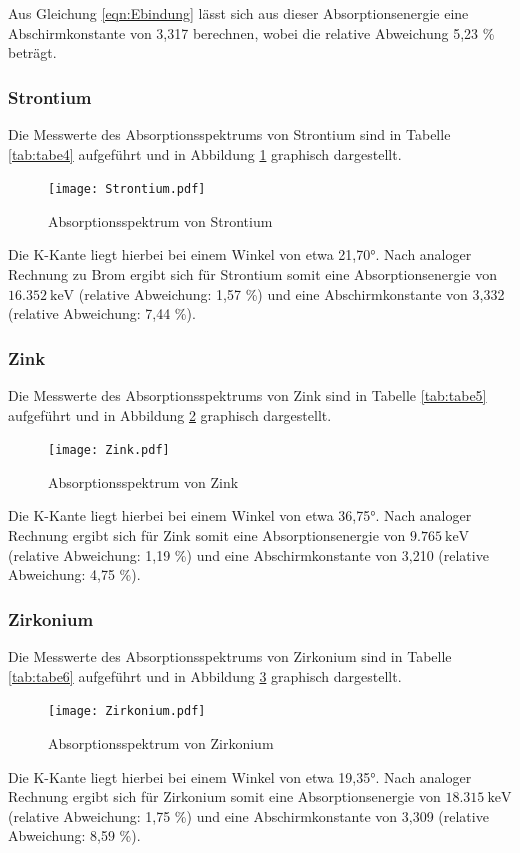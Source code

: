 Aus Gleichung \ref{eqn:Ebindung} lässt sich aus dieser Absorptionsenergie eine Abschirmkonstante
von 3,317 berechnen, wobei die relative Abweichung 5,23 \% beträgt.

\subsubsection{Strontium}
Die Messwerte des Absorptionsspektrums von Strontium sind in Tabelle \ref{tab:tabe4} aufgeführt und
in Abbildung \ref{fig:Strontium} graphisch dargestellt.

\begin{figure}[H]
  \centering
  \texttt{[image: Strontium.pdf]}
  \caption{Absorptionsspektrum von Strontium}
  \label{fig:Strontium}
\end{figure}
Die K-Kante liegt hierbei bei einem Winkel von etwa 21,70°. Nach analoger Rechnung zu Brom
ergibt sich für Strontium somit eine Absorptionsenergie von $\SI{16.352}{\kilo\electronvolt}$
(relative Abweichung: 1,57 \%) und eine Abschirmkonstante von 3,332 (relative Abweichung: 7,44 \%).

\subsubsection{Zink}
Die Messwerte des Absorptionsspektrums von Zink sind in Tabelle \ref{tab:tabe5} aufgeführt und
in Abbildung \ref{fig:Zink} graphisch dargestellt.

\begin{figure}[H]
  \centering
  \texttt{[image: Zink.pdf]}
  \caption{Absorptionsspektrum von Zink}
  \label{fig:Zink}
\end{figure}
Die K-Kante liegt hierbei bei einem Winkel von etwa 36,75°. Nach analoger Rechnung
ergibt sich für Zink somit eine Absorptionsenergie von $\SI{9.765}{\kilo\electronvolt}$
(relative Abweichung: 1,19 \%) und eine Abschirmkonstante von 3,210 (relative Abweichung: 4,75 \%).

\subsubsection{Zirkonium}
Die Messwerte des Absorptionsspektrums von Zirkonium sind in Tabelle \ref{tab:tabe6} aufgeführt und
in Abbildung \ref{fig:Zirkonium} graphisch dargestellt.

\begin{figure}[H]
  \centering
  \texttt{[image: Zirkonium.pdf]}
  \caption{Absorptionsspektrum von Zirkonium}
  \label{fig:Zirkonium}
\end{figure}
Die K-Kante liegt hierbei bei einem Winkel von etwa 19,35°. Nach analoger Rechnung
ergibt sich für Zirkonium somit eine Absorptionsenergie von $\SI{18.315}{\kilo\electronvolt}$
(relative Abweichung: 1,75 \%) und eine Abschirmkonstante von 3,309 (relative Abweichung: 8,59 \%).
